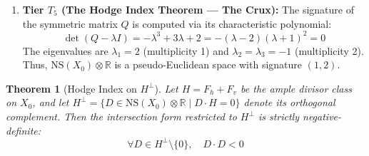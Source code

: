 \documentclass[11pt,a4paper]{article}
\newtheorem{theorem}{Theorem}[section]
\theoremstyle{definition}
\theoremstyle{remark}
\begin{document}
\begin{enumerate}
\begin{equation}
    H^2 = (F_h + F_v) \cdot (F_h + F_v) = F_h^2 + 2(F_h \cdot F_v) + F_v^2 = 0 + 2(1) + 0 = 2 > 0
    \end{equation}
    \item \textbf{Tier $T_5$ (The Hodge Index Theorem --- The Crux):} The signature of the symmetric matrix $Q$ is computed via its characteristic polynomial:
    \begin{equation}
    \det(Q - \lambda I) = -\lambda^3 + 3\lambda + 2 = -(\lambda - 2)(\lambda + 1)^2 = 0
    \end{equation}
    The eigenvalues are $\lambda_1 = 2$ (multiplicity 1) and $\lambda_2 = \lambda_3 = -1$ (multiplicity 2). Thus, $\mathrm{NS}(X_0) \otimes \mathbb{R}$ is a pseudo-Euclidean space with signature $(1, 2)$.
\end{enumerate}

\begin{theorem}[Hodge Index on $H^\perp$]
Let $H = F_h + F_v$ be the ample divisor class on $X_0$, and let $H^\perp = \{D \in \mathrm{NS}(X_0) \otimes \mathbb{R} \mid D \cdot H = 0\}$ denote its orthogonal complement. Then the intersection form restricted to $H^\perp$ is strictly negative-definite:
\begin{equation}
\forall D \in H^\perp \setminus \{0\}, \quad D \cdot D < 0
\end{equation}
\end{theorem}
\end{document}
